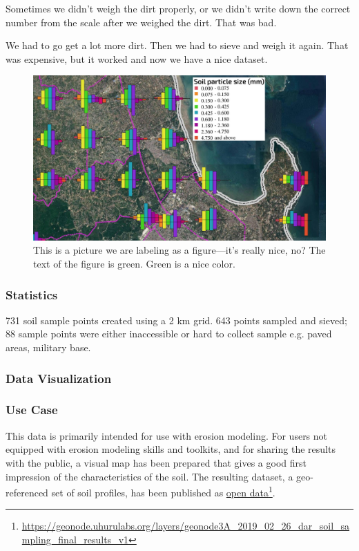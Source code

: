 \documentclass[a4paper,12pt,twoside]{article}
\begin{document}
\bigskip

Sometimes we didn't weigh the dirt properly, or we didn't write down the correct number from the scale after we weighed the dirt. That was bad. 

We had to go get a lot more dirt. Then we had to sieve and weigh it again. That was expensive, but it worked and now we have a nice dataset.

\begin{figure}[h]
  \color{RHgreen}\caption{This is a picture we are labeling as a figure---it's really nice, no? The text of the figure is green. Green is a nice color.}
  \centering
  \includegraphics[width=1\textwidth]{soil_map_detail_peninsula_with_legend}
\end{figure}

\subsubsection{Statistics}
731 soil sample points created using a 2 km grid. 643 points sampled and sieved; 88 sample points were either inaccessible or hard to collect sample e.g. paved areas, military base.

\subsubsection{Data Visualization}

\subsubsection{Use Case}
This data is primarily intended for use with erosion modeling. For users not equipped with erosion modeling skills and toolkits, and for sharing the results with the public, a visual map has been prepared that gives a good first impression of the characteristics of the soil.
The resulting dataset, a geo-referenced set of soil profiles, has been published as \href{https://geonode.uhurulabs.org/layers/geonode3A_2019_02_26_dar_soil_sampling_final_results_v1}{open data}\footnote{\url{https://geonode.uhurulabs.org/layers/geonode3A_2019_02_26_dar_soil_sampling_final_results_v1}}.
\end{document}
